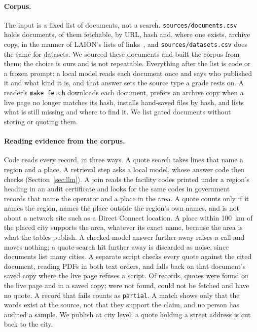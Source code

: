 \documentclass[10pt,twocolumn]{article}
\newcommand{\code}[1]{\texttt{#1}}
\begin{document}
\paragraph{Corpus.} The input is a fixed list of documents, not a search. \code{sources/documents.csv} holds \corpusDocuments{} documents, \corpusFetched{} of them fetchable, by URL, hash and, where one exists, archive copy, in the manner of LAION's lists of links~\citep{schuhmann2022laion}, and \code{sources/datasets.csv} does the same for datasets. We sourced these documents and built the corpus from them; the choice is ours and is not repeatable. Everything after the list is code or a frozen prompt: a local model reads each document once and says who published it and what kind it is, and that answer sets the source type a grade rests on. A reader's \code{make fetch} downloads each document, prefers an archive copy when a live page no longer matches its hash, installs hand-saved files by hash, and lists what is still missing and where to find it. We list gated documents without storing or quoting them.

\paragraph{Reading evidence from the corpus.} Code reads every record, in three ways. A quote search takes lines that name a region and a place. A retrieval step asks a local model, whose answer code then checks (Section~\ref{sec:llm}). A join reads the facility codes printed under a region's heading in an audit certificate and looks for the same codes in government records that name the operator and a place in the area. A quote counts only if it names the region, names the place outside the region's own names, and is not about a network site such as a Direct Connect location. A place within 100~km of the placed city supports the area, whatever its exact name, because the area is what the tables publish. A checked model answer further away raises a call and moves nothing; a quote-search hit further away is discarded as noise, since documents list many cities. A separate script checks every quote against the cited document, reading PDFs in both text orders, and falls back on that document's saved copy where the live page refuses a script. Of \verifyTotal{} records, \verifyFound{} quotes were found on the live page and \verifySaved{} in a saved copy; \verifyNotFound{} were not found, \verifyUnreachable{} could not be fetched and \verifyNoQuote{} have no quote. A record that fails counts as \code{partial}. A match shows only that the words exist at the source, not that they support the claim, and no person has audited a sample. We publish at city level: a quote holding a street address is cut back to the city.
\end{document}
